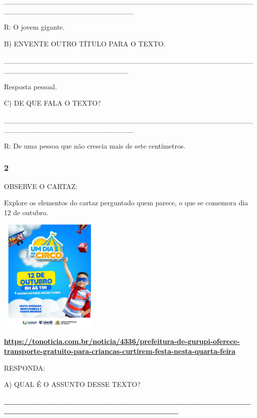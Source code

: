\_\_\_\_\_\_\_\_\_\_\_\_\_\_\_\_\_\_\_\_\_\_\_\_\_\_\_\_\_\_\_\_\_\_\_\_\_\_\_\_\_\_\_\_\_\_\_\_\_\_\_\_\_\_\_\_\_\_\_\_\_\_\_\_\_\_\_\_\_\_\_\_\_

R: O jovem gigante.

B) ENVENTE OUTRO TÍTULO PARA O TEXTO.

\_\_\_\_\_\_\_\_\_\_\_\_\_\_\_\_\_\_\_\_\_\_\_\_\_\_\_\_\_\_\_\_\_\_\_\_\_\_\_\_\_\_\_\_\_\_\_\_\_\_\_\_\_\_\_\_\_\_\_\_\_\_\_\_\_\_\_\_\_\_\_\_

Resposta pessoal.

C) DE QUE FALA O TEXTO?

\_\_\_\_\_\_\_\_\_\_\_\_\_\_\_\_\_\_\_\_\_\_\_\_\_\_\_\_\_\_\_\_\_\_\_\_\_\_\_\_\_\_\_\_\_\_\_\_\_\_\_\_\_\_\_\_\_\_\_\_\_\_\_\_\_\_\_\_\_\_\_\_\_

R: De uma pessoa que não crescia mais de sete centímetros.

\subsubsection{2}\label{section-56}

OBSERVE O CARTAZ:

Explore os elementos do cartaz perguntado quem parece, o que se comemora
dia 12 de outubro.

\includegraphics[width=1.92500in,height=2.18056in]{media/image119.jpeg}

\protect\hypertarget{_heading=h.t2raxp5v2ex8}{}{}

\href{https://tonoticia.com.br/noticia/4336/prefeitura-de-gurupi-oferece-transporte-gratuito-para-criancas-curtirem-festa-nesta-quarta-feira}{\textbf{https://tonoticia.com.br/noticia/4336/prefeitura-de-gurupi-oferece-transporte-gratuito-para-criancas-curtirem-festa-nesta-quarta-feira}}

RESPONDA:

A) QUAL É O ASSUNTO DESSE TEXTO?

\textbf{\_\_\_\_\_\_\_\_\_\_\_\_\_\_\_\_\_\_\_\_\_\_\_\_\_\_\_\_\_\_\_\_\_\_\_\_\_\_\_\_\_\_\_\_\_\_\_\_\_\_\_\_\_\_\_\_\_\_\_\_\_\_\_\_\_\_\_\_\_\_}


